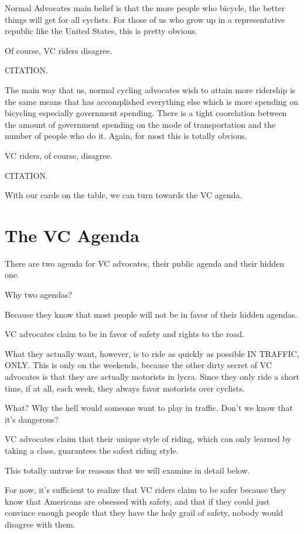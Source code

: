 Normal Advocates main belief is that the more people who bicycle, the better things will get for all cyclists. For those of us who grow up in a representative republic like the United States, this is pretty obvious.

Of course, VC riders disagree.

CITATION.

The main way that us, normal cycling advocates wish to attain more ridership is
the same means that has accomplished everything else which is more spending on
bicycling especially government spending. There is a tight coorelation between
the amount of government spending on the mode of transportation and the number
of people who do it. Again, for most this is totally obvious.

VC riders, of course, disagree.

CITATION.

With our cards on the table, we can turn towards the VC agenda.

\section{The VC Agenda}

There are two agenda for VC advocates, their public agenda and their hidden one. 

Why two agendas?

Because they know that most people will not be in favor of their hidden agendas.

VC advocates claim to be in favor of safety and rights to the road.

What they actually want, however, is to ride as quickly as possible IN TRAFFIC, ONLY. This is only on the weekends, because the other dirty secret of VC advocates is that they are actually motorists in lycra. Since they only ride a short time, if at all, each week, they always favor motorists over cyclists.

What? Why the hell would someone want to play in traffic. Don't we know that it's dangerous?

VC advocates claim that their unique style of riding, which can only learned by
taking a class, guarantees the safest riding style.

This totally untrue for reasons that we will examine in detail below.

For now, it's sufficient to realize that VC riders claim to be safer because
they know that Americans are obsessed with safety, and that if they could just
convince enough people that they have the holy grail of safety, nobody would
disagree with them.

